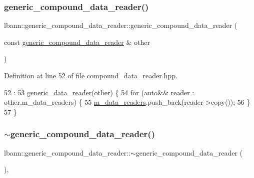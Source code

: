 \subsubsection{\texorpdfstring{generic\+\_\+compound\+\_\+data\+\_\+reader()}{generic\_compound\_data\_reader()}\hspace{0.1cm}{\footnotesize\ttfamily [2/2]}}
{\footnotesize\ttfamily lbann\+::generic\+\_\+compound\+\_\+data\+\_\+reader\+::generic\+\_\+compound\+\_\+data\+\_\+reader (\begin{DoxyParamCaption}\item[{const \hyperlink{classlbann_1_1generic__compound__data__reader}{generic\+\_\+compound\+\_\+data\+\_\+reader} \&}]{other }\end{DoxyParamCaption})\hspace{0.3cm}{\ttfamily [inline]}}



Definition at line 52 of file compound\+\_\+data\+\_\+reader.\+hpp.


\begin{DoxyCode}
52                                                                          :
53     \hyperlink{classlbann_1_1generic__data__reader_aaba933b8f7c1227801f6e80d39986af4}{generic\_data\_reader}(other) \{
54     \textcolor{keywordflow}{for} (\textcolor{keyword}{auto}&& reader : other.m\_data\_readers) \{
55       \hyperlink{classlbann_1_1generic__compound__data__reader_a9815e94ade5873415fd766e09d956d5b}{m\_data\_readers}.push\_back(reader->copy());
56     \}
57   \}
\end{DoxyCode}
\mbox{\label{classlbann_1_1generic__compound__data__reader_a9fbabf1628a892500e1cd8f75738ce7d}} 
\subsubsection{\texorpdfstring{$\sim$generic\+\_\+compound\+\_\+data\+\_\+reader()}{~generic\_compound\_data\_reader()}}
{\footnotesize\ttfamily lbann\+::generic\+\_\+compound\+\_\+data\+\_\+reader\+::$\sim$generic\+\_\+compound\+\_\+data\+\_\+reader (\begin{DoxyParamCaption}{ }\end{DoxyParamCaption})\hspace{0.3cm}{\ttfamily [inline]}, {\ttfamily [override]}}



